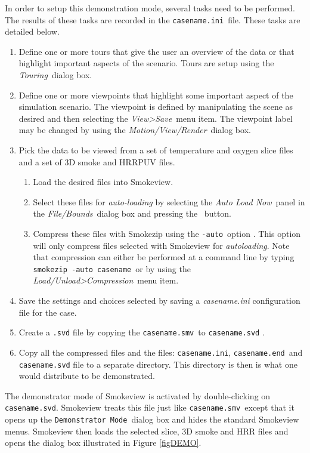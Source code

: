 \documentclass[11pt,twoside]{book}
\newcommand{\frameit}[1]{\fbox{\tt #1}}
\begin{document}
In order to setup this demonstration mode, several tasks need to be performed.  The results of these tasks are
recorded in the {\tt casename.ini}\ file.
These tasks are detailed below.

\begin{enumerate}
  \item Define one or more tours that give the user an overview of the data or that highlight important
  aspects of the scenario.   Tours are setup using the {\em Touring}\ dialog box.
  \item Define one or more viewpoints that highlight some important
  aspect of the simulation scenario.  The viewpoint is defined by manipulating the scene as desired and then selecting the {\em View>Save}\ menu item.  The viewpoint label may be changed by using the {\em Motion/View/Render}\ dialog box.
  \item Pick the data to be viewed from a set of temperature and oxygen slice files and a set of 3D smoke and HRRPUV files.
  \begin{enumerate}
    \item Load the desired files into Smokeview.
    \item Select these files for {\em auto-loading} by selecting the {\em Auto Load Now}\ panel
    in the {\em File/Bounds}\ dialog box and pressing the \frameit{Save Auto Load File List}\ button.
    \item Compress these files with Smokezip using the {\tt -auto}\ option .  This option will only compress files selected with Smokeview for {\em autoloading}.  Note that compression can either be performed at a command line by typing {\tt smokezip -auto casename}\ or by using the {\em Load/Unload>Compression}\ menu item.
      \end{enumerate}
  \item Save the settings and choices selected by saving a {\em casename.ini} configuration file for the case.
  \item Create a {\tt .svd} file by copying the {\tt casename.smv}\ to {\tt casename.svd} .
  \item Copy all the compressed files and the files: {\tt casename.ini}, {\tt casename.end}\ and {\tt casename.svd} file to a separate directory.  This directory is then is what one would distribute to be demonstrated.
\end{enumerate}

The demonstrator mode of Smokeview is activated by double-clicking on {\tt casename.svd}.  Smokeview treats this file just like {\tt casename.smv}\ except that it opens up the {\tt Demonstrator Mode}\ dialog box and hides the standard Smokeview menus.  Smokeview then
loads the selected slice, 3D smoke and HRR files and opens the dialog box illustrated in
Figure \ref{figDEMO}.
\end{document}

